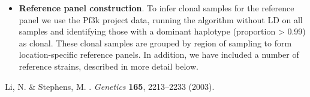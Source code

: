 \documentclass{nature}
\newcounter{firstbib}
\begin{document}
\begin{itemize}
\item {\bf Reference panel construction}. To infer clonal samples for the reference panel we use the Pf3k \cite{Pf3k2016} project data, running the algorithm without LD on all samples and identifying those with a dominant haplotype (proportion > 0.99) as clonal.  These clonal samples are grouped by region of sampling to form location-specific reference panels.  In addition, we have included a number of reference strains, described in more detail below.

\end{itemize}


\begin{thebibliography}{9}
\setcounter{enumiv}{\value{firstbib}}
{Li, N.} \& {Stephens, M.}
.
\newblock \emph{{Genetics}} \textbf{{165}},
  {2213--2233} ({2003}).
\end{thebibliography}
\end{document}
